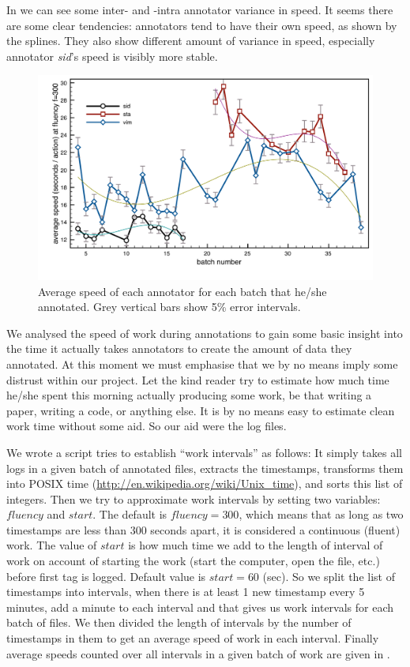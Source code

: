 In  we can see some inter- and -intra annotator variance in speed. It seems there are some clear tendencies: annotators tend to have their own speed, as shown by the splines. They also show different amount of variance in speed, especially annotator \emph{sid}'s speed is visibly more stable.

\begin{figure}[htbp]
   \centering
   \includegraphics[width=\textwidth]{images/speed/speed-anot3} 
   \caption{Average speed of each annotator for each batch that he/she annotated. Grey vertical bars show 5\% error intervals.}
   \label{fig:speed}
\end{figure}

We analysed the speed of work during annotations to gain some basic insight into the time it actually takes annotators to create the amount of data they annotated. At this moment we must emphasise that we by no means imply some distrust within our project. Let the kind reader try to estimate how much time he/she spent this morning actually producing some work, be that writing a paper, writing a code, or anything else. It is by no means easy to estimate clean work time without some aid. So our aid were the log files.

We wrote a script tries to establish ``work intervals'' as follows: It simply takes all logs in a given batch of annotated files, extracts the timestamps, transforms them into POSIX time (\url{http://en.wikipedia.org/wiki/Unix_time}), and sorts this list of integers. Then we try to approximate work intervals by setting two variables: $fluency$ and $start$. The default is $fluency=300$, which means that as long as two timestamps are less than 300 seconds apart, it is considered a continuous (fluent) work. The value of $start$ is how much time we add to the length of interval of work on account of starting the work (start the computer, open the file, etc.) before first tag is logged. Default value is $start=60$ (sec). So we split the list of timestamps into intervals, when there is at least 1 new timestamp every 5 minutes, add a minute to each interval and that gives us work intervals for each batch of files. We then divided the length of intervals by the number of timestamps in them to get an average speed of work in each interval. Finally average speeds counted over all intervals in a given batch of work are given in .
